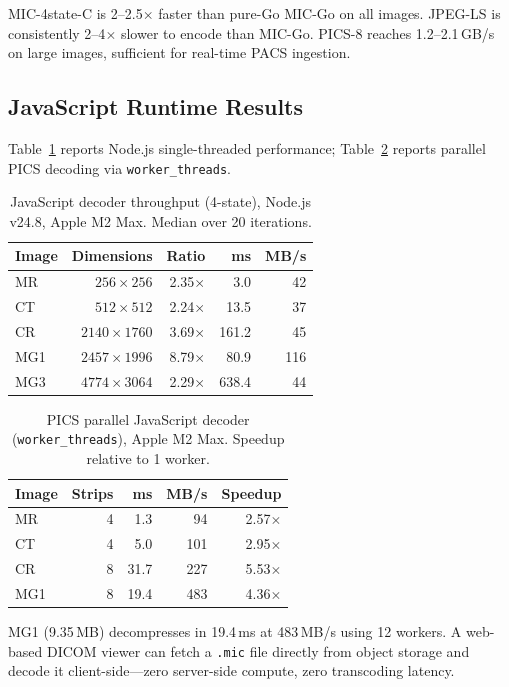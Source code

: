 \documentclass[journal]{IEEEtran}
\begin{document}
MIC-4state-C is 2--2.5$\times$ faster than pure-Go MIC-Go on all images.
JPEG-LS is consistently 2--4$\times$ slower to encode than MIC-Go. PICS-8
reaches 1.2--2.1\,GB/s on large images, sufficient for real-time PACS
ingestion.

\subsection{JavaScript Runtime Results}

Table~\ref{tab:js-perf} reports Node.js single-threaded performance;
Table~\ref{tab:pics-js} reports parallel PICS decoding via
\texttt{worker\_threads}.

\begin{table}[htbp]
\centering
\caption{JavaScript decoder throughput (4-state), Node.js v24.8, Apple M2 Max.
Median over 20 iterations.}
\label{tab:js-perf}
\begin{tabular}{lrrrr}
\toprule
Image & Dimensions & Ratio & ms & MB/s \\
\midrule
MR  & $256{\times}256$ & 2.35$\times$ & 3.0 & 42 \\
CT  & $512{\times}512$ & 2.24$\times$ & 13.5 & 37 \\
CR  & $2140{\times}1760$ & 3.69$\times$ & 161.2 & 45 \\
MG1 & $2457{\times}1996$ & 8.79$\times$ & 80.9 & 116 \\
MG3 & $4774{\times}3064$ & 2.29$\times$ & 638.4 & 44 \\
\bottomrule
\end{tabular}
\end{table}

\begin{table}[htbp]
\centering
\caption{PICS parallel JavaScript decoder (\texttt{worker\_threads}), Apple M2
Max. Speedup relative to 1 worker.}
\label{tab:pics-js}
\begin{tabular}{lrrrr}
\toprule
Image & Strips & ms & MB/s & Speedup \\
\midrule
MR  & 4 & 1.3 & 94 & 2.57$\times$ \\
CT  & 4 & 5.0 & 101 & 2.95$\times$ \\
CR  & 8 & 31.7 & 227 & 5.53$\times$ \\
MG1 & 8 & 19.4 & 483 & 4.36$\times$ \\
\bottomrule
\end{tabular}
\end{table}

MG1 (9.35\,MB) decompresses in 19.4\,ms at 483\,MB/s using 12 workers. A
web-based DICOM viewer can fetch a \texttt{.mic} file directly from object
storage and decode it client-side---zero server-side compute, zero transcoding
latency.
\end{document}

